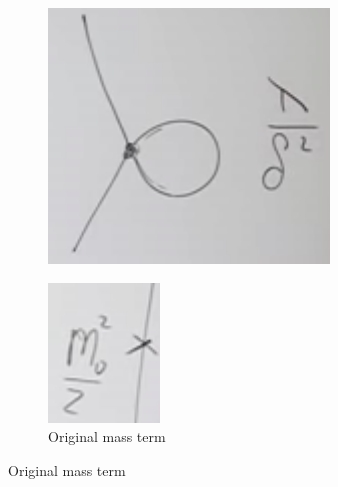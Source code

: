 \documentclass[]{article}
\begin{document}
\begin{figure}[H]
\begin{subfigure}[t]{0.3\textwidth}
		\includegraphics[width=\textwidth]{3-1-cutoff}
	\end{subfigure}
		\begin{subfigure}[t]{0.3\textwidth}
		\caption{Original mass term}\label{fig:3-1-original}
		\includegraphics[width=\textwidth]{3-1-original}
	\end{subfigure}
\end{figure}
\end{document}
